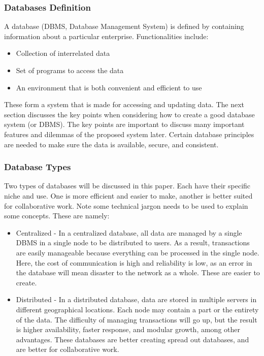 \documentclass[acmsmall]{acmart}
\begin{document}
\subsubsection{Databases Definition}
A database (DBMS, Database Management System) is defined by containing information about a particular enterprise. Functionalities include: \cite{Silberschatz2010}
\begin{itemize}
    \item Collection of interrelated data
    \item Set of programs to access the data
    \item An environment that is both convenient and efficient to use
\end{itemize}

These form a system that is made for accessing and updating data. The next section discusses the key points when considering how to  create a good database system (or DBMS). The key points are important to discuss many important features and dilemmas of the proposed system later. Certain database principles are needed to make sure the data is available, secure, and consistent. 



\subsubsection{Database Types} 
Two types of databases will be discussed in this paper. Each have their specific niche and use. One is more efficient and easier to make, another is better suited for collaborative work. Note some technical jargon needs to be used to explain some concepts. These are namely: \cite{centralizedvsdistributed}

\begin{itemize}
    \item Centralized - In a centralized database, all data are managed by a single DBMS in a single node to be distributed to users. As a result, transactions are easily manageable because everything can be processed in the single node. Here, the cost of communication is high and reliability is low, as an error in the database will mean disaster to the network as a whole. These are easier to create.
    
    \item Distributed - In a distributed database, data are stored in multiple servers in different geographical locations. Each node may contain a part or the entirety of the data. The difficulty of managing transactions will go up, but the result is higher availability, faster response, and modular growth, among other advantages. These databases are better creating spread out databases, and are better for collaborative work.
\end{itemize}
\end{document}
